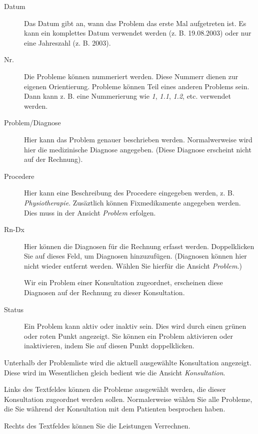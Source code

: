 \begin{description}

\item[Datum]
Das Datum gibt an, wann das Problem das erste Mal aufgetreten ist. Es kann ein
komplettes Datum verwendet werden (z. B. 19.08.2003) oder nur eine Jahreszahl
(z. B. 2003).

\item[Nr.]
Die Probleme können nummeriert werden. Diese Nummerr
dienen zur eigenen Orientierung. Probleme können Teil eines anderen Problems
sein. Dann kann z. B. eine Nummerierung wie \textit{1}, \textit{1.1}, \textit{1.2}, etc.
verwendet werden.

\item[Problem/Diagnose]
Hier kann das Problem genauer beschrieben werden. Normalwerweise wird hier
die medizinische Diagnose angegeben. (Diese Diagnose erscheint nicht auf der
Rechnung).

\item[Procedere]
Hier kann eine Beschreibung des Procedere eingegeben werden, z. B. \textit{Physiotherapie}.
Zusäztlich können Fixmedikamente angegeben werden. Dies muss in der Ansicht \textit{Problem}
erfolgen.

\item[Rn-Dx]
Hier können die Diagnosen für die Rechnung erfasst werden. Doppelklicken Sie
auf dieses Feld, um Diagnosen hinzuzufügen. (Diagnosen können hier nicht wieder
entfernt werden. Wählen Sie hierfür die Ansicht \textit{Problem}.)

Wir ein Problem einer Konsultation zugeordnet, erscheinen diese Diagnosen
auf der Rechnung zu dieser Konsultation.

\item[Status]
Ein Problem kann aktiv oder inaktiv sein. Dies wird durch einen grünen oder
roten Punkt angezeigt. Sie können ein Problem aktivieren oder inaktivieren,
indem Sie auf diesen Punkt doppelklicken.

\end{description}

Unterhalb der Problemliste wird die aktuell ausgewählte Konsultation angezeigt.
Diese wird im Wesentlichen gleich bedient wie die Ansicht \textit{Konsultation}.

Links des Textfeldes können die Probleme ausgewählt werden, die dieser Konsultation
zugeordnet werden sollen. Normalerweise wählen Sie alle Probleme, die Sie
während der Konsultation mit dem Patienten besprochen haben.

Rechts des Textfeldes können Sie die Leistungen Verrechnen.

